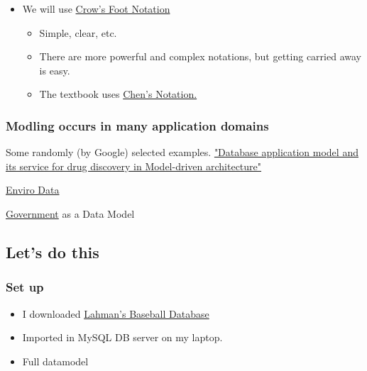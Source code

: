 \documentclass[11pt]{article}
\providecommand{\tightlist}{%
      \setlength{\itemsep}{0pt}\setlength{\parskip}{0pt}}
\begin{document}
\begin{itemize}
\tightlist
\item
  We will use
  \href{https://en.wikipedia.org/wiki/Entity\%E2\%80\%93relationship_model\#Crow's_foot_notation}{Crow's
  Foot Notation}

  \begin{itemize}
  \tightlist
  \item
    Simple, clear, etc.
  \item
    There are more powerful and complex notations, but getting carried
    away is easy.
  \item
    The textbook uses
    \href{https://en.wikipedia.org/wiki/Entity\%E2\%80\%93relationship_model\#Entity\%E2\%80\%93relationship_modeling}{Chen's
    Notation.}
  \end{itemize}
\end{itemize}

    \subsubsection{Modling occurs in many application
domains}\label{modling-occurs-in-many-application-domains}

Some randomly (by Google) selected examples.
\href{https://doi.org/10.1186/s40537-015-0024-1}{"Database application
model and its service for drug discovery in Model-driven architecture"}

 \href{http://geotech.com/envirodata}{Enviro Data}


\href{https://gds.blog.gov.uk/2013/10/31/government-as-a-data-model-what-i-learned-in-estonia/}{Government}
as a Data Model

    \subsection{Let's do this}\label{lets-do-this}

\subsubsection{Set up}\label{set-up}

\begin{itemize}
\item
  I downloaded
  \href{http://www.seanlahman.com/baseball-archive/statistics/}{Lahman's
  Baseball Database}
\item
  Imported in MySQL DB server on my laptop.
\item
  Full datamodel
\end{itemize}
\end{document}
